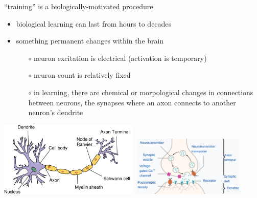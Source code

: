 \documentclass[xcolor={svgnames},
               hyperref={colorlinks,citecolor=DeepPink4,linkcolor=FireBrick,urlcolor=Maroon}]
               {beamer}
\begin{document}
\begin{frame}{``training'' is a biologically-motivated procedure}

\begin{itemize}
\item biological learning can last from hours to decades
\item something permanent changes within the brain
    \begin{itemize}
    \item[$\circ$] neuron excitation is electrical (activation is temporary)
    \item[$\circ$] neuron count is relatively fixed
    \item[$\circ$] in learning, there are chemical or morpological changes in connections between neurons, the \alert{synapses} where an axon connects to another neuron's dendrite
    \end{itemize}
\end{itemize}

\begin{center}
\mbox{\includegraphics[width=0.5\textwidth]{figs/physicalneuron} \includegraphics[width=0.4\textwidth]{figs/synapse}}
\end{center}
\end{frame}
\end{document}
